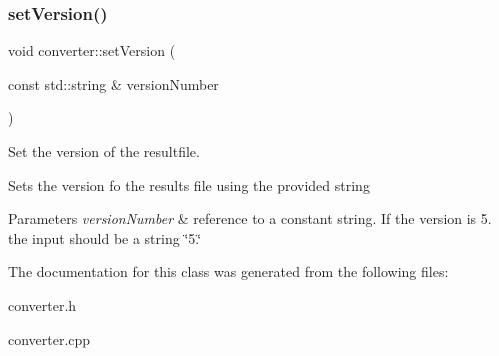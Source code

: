 \subsubsection{\texorpdfstring{set\+Version()}{setVersion()}}
{\footnotesize\ttfamily void converter\+::set\+Version (\begin{DoxyParamCaption}\item[{const std\+::string \&}]{version\+Number }\end{DoxyParamCaption})\hspace{0.3cm}{\ttfamily [inline]}}



Set the version of the resultfile. 

Sets the version fo the results file using the provided string 
\begin{DoxyParams}{Parameters}
{\em version\+Number} & reference to a constant string. If the version is 5. the input should be a string \char`\"{}5.\char`\"{} \\
\hline
\end{DoxyParams}


The documentation for this class was generated from the following files\+:\begin{DoxyCompactItemize}
\item 
converter.\+h\item 
converter.\+cpp\end{DoxyCompactItemize}
